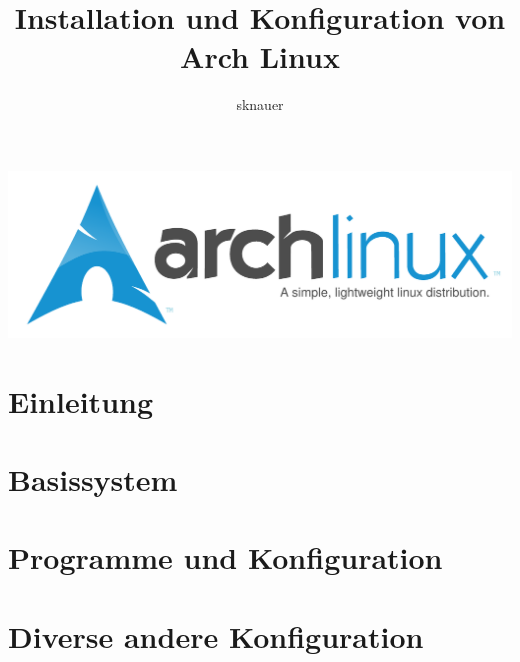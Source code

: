 \documentclass[11pt]{scrartcl}
\author{sknauer}
\title{Installation und Konfiguration von Arch Linux}
\begin{document}
\maketitle
\includegraphics[scale=0.75]{arch-logo.pdf}

\section{Einleitung}
\label{sec:einleitung}


\section{Basissystem}
\label{sec:base-system}

    
\section{Programme und Konfiguration}
\label{sec:programme}


\section{Diverse andere Konfiguration}
\label{sec:config}

\end{document}
